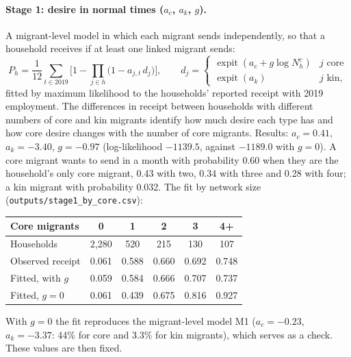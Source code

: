 \documentclass[11pt]{article}
\newcommand{\expit}{\operatorname{expit}}
\begin{document}
\paragraph{Stage 1: desire in normal times ($a_c$, $a_k$, $g$).} A migrant-level model in which each migrant sends independently, so that a household receives if at least one linked migrant sends:
\begin{equation}
P_h = \frac{1}{12} \sum_{t \in 2019} \Big[1 - \prod_{j \in h} \big(1 - a_{j,t}\,d_j\big)\Big], \qquad
d_j = \begin{cases} \expit(a_c + g \log N^c_h) & j \text{ core} \\ \expit(a_k) & j \text{ kin,} \end{cases}
\end{equation}
fitted by maximum likelihood to the households' reported receipt with 2019 employment. The differences in receipt between households with different numbers of core and kin migrants identify how much desire each type has and how core desire changes with the number of core migrants. Results: $a_c = 0.41$, $a_k = -3.40$, $g = -0.97$ (log-likelihood $-1139.5$, against $-1189.0$ with $g = 0$). A core migrant wants to send in a month with probability 0.60 when they are the household's only core migrant, 0.43 with two, 0.34 with three and 0.28 with four; a kin migrant with probability 0.032. The fit by network size (\texttt{outputs/stage1\_by\_core.csv}):
\begin{center}
\begin{tabular}{lccccc}
\toprule
Core migrants & 0 & 1 & 2 & 3 & 4+ \\
\midrule
Households & 2,280 & 520 & 215 & 130 & 107 \\
Observed receipt & 0.061 & 0.588 & 0.660 & 0.692 & 0.748 \\
Fitted, with $g$ & 0.059 & 0.584 & 0.666 & 0.707 & 0.737 \\
Fitted, $g = 0$ & 0.061 & 0.439 & 0.675 & 0.816 & 0.927 \\
\bottomrule
\end{tabular}
\end{center}
With $g = 0$ the fit reproduces the migrant-level model M1 ($a_c = -0.23$, $a_k = -3.37$: 44\% for core and 3.3\% for kin migrants), which serves as a check. These values are then fixed.
\end{document}
